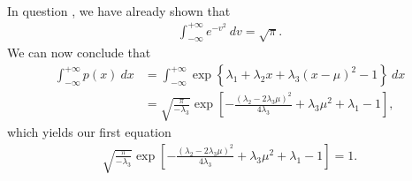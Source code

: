 \begin{answer}{}
\begin{align}
	\end{align}
	In question , we have already shown that
	\begin{align}
		\int_{-\infty}^{+\infty} e^{-v^2}\ dv = \sqrt{\pi}.
	\end{align}
	We can now conclude that
	\begin{align}
		\int_{-\infty}^{+\infty} p(x)\ dx &= \int_{-\infty}^{+\infty} \exp\left\{ \lambda_1 + \lambda_2 x + \lambda_3(x-\mu)^2 - 1 \right\}\ dx\\
		&= \sqrt{\frac{\pi}{-\lambda_3}}\exp\left[ -\frac{(\lambda_2 - 2\lambda_3\mu)^2}{4\lambda_3} + \lambda_3 \mu^2 + \lambda_1 - 1 \right], \label{1.34eqn5}
	\end{align}
	which yields our first equation
	\begin{align}\label{1.34eqn_first}
		\sqrt{\frac{\pi}{-\lambda_3}}\exp\left[ -\frac{(\lambda_2 - 2\lambda_3\mu)^2}{4\lambda_3} + \lambda_3 \mu^2 + \lambda_1 - 1 \right] = 1.
	\end{align}


\end{answer}
